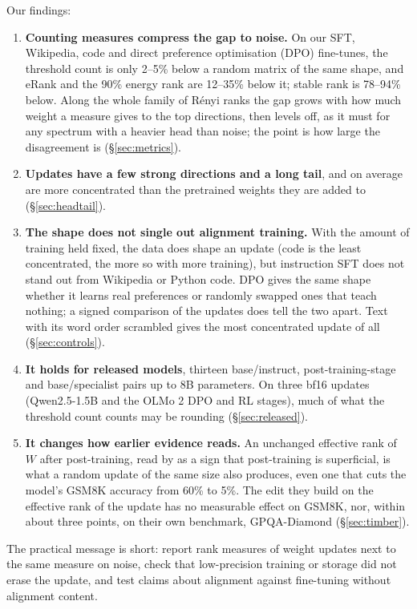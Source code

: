 Our findings:

\begin{enumerate}
  \item \textbf{Counting measures compress the gap to noise.} On our SFT,
  Wikipedia, code and direct preference optimisation (DPO) fine-tunes, the
  threshold count is only 2--5\%
  below a random matrix of the same shape, and eRank and the 90\% energy rank
  are 12--35\% below it; stable rank is 78--94\% below. Along the whole family
  of R\'enyi ranks the gap grows with how much weight a measure gives to the
  top directions, then levels off, as it must for any spectrum with a heavier
  head than noise; the point is how large the disagreement is
  (\S\ref{sec:metrics}).
  \item \textbf{Updates have a few strong directions and a long tail}, and on
  average are more concentrated than the pretrained weights they are added to
  (\S\ref{sec:headtail}).
  \item \textbf{The shape does not single out alignment training.} With the
  amount of training held fixed, the data does shape an update (code is the
  least concentrated, the more so with more training), but instruction SFT
  does not stand out from Wikipedia or Python code. DPO gives the same shape
  whether it learns real preferences or randomly swapped ones that teach
  nothing; a signed comparison of the updates does tell the two apart. Text with its word order scrambled gives
  the most concentrated update of all (\S\ref{sec:controls}).
  \item \textbf{It holds for released models}, thirteen base/instruct,
  post-training-stage and base/specialist pairs up to 8B parameters. On three
  bf16 updates (Qwen2.5-1.5B and the OLMo 2 DPO and RL stages), much of what
  the threshold count counts may be rounding (\S\ref{sec:released}).
  \item \textbf{It changes how earlier evidence reads.} An unchanged effective
  rank of $W$ after post-training, read by \citet{wu2025timber} as a sign that
  post-training is superficial, is what a random update of the same size also
  produces, even one that cuts the model's GSM8K accuracy from 60\% to 5\%.
  The edit they build on the effective rank of the update has no measurable
  effect on GSM8K, nor, within about three points, on their own benchmark,
  GPQA-Diamond (\S\ref{sec:timber}).
\end{enumerate}

The practical message is short: report rank measures of weight updates next to
the same measure on noise, check that low-precision training or storage did
not erase the update, and test claims about alignment against fine-tuning
without alignment content.
